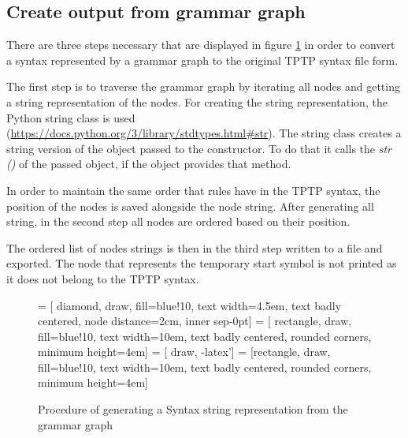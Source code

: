\subsection{Create output from grammar graph}\label{sec:ConceptOutputGrammarGraph}

There are three steps necessary that are displayed in figure \ref{fig:ConceptOutputGrammarGraphProcedure} in order to convert a syntax represented by a grammar graph to the original \ac{TPTP} syntax file form.

The first step is to traverse the grammar graph by iterating all nodes and getting a string representation of the nodes.
For creating the string representation, the Python string class is used (\url{https://docs.python.org/3/library/stdtypes.html#str}). The string class creates a string version of the object passed to the constructor.
To do that it calls the \textit{\textunderscore \textunderscore str \textunderscore \textunderscore ()} of the passed object, if the object provides that method.

In order to maintain the same order that rules have in the \ac{TPTP} syntax, the position of the nodes is saved alongside the node string. 
After generating all string, in the second step all nodes are ordered based on their position. 

The ordered list of nodes strings is then in the third step written to a file and exported.
The node that represents the temporary start symbol is not printed as it does not belong to the \ac{TPTP} syntax. 
 
\begin{figure}[H]
 = [ diamond, draw, fill=blue!10, text width=4.5em, text badly centered, node distance=2cm, inner sep-0pt]  
 = [ rectangle, draw, fill=blue!10, text width=10em, text badly centered, rounded corners, minimum height=4em]  
 = [ draw, -latex']  
 = [rectangle, draw, fill=blue!10, text width=10em, text badly centered, rounded corners, minimum height=4em]  
\begin{center}
\end{center}
\caption{Procedure of generating a Syntax string representation from the grammar graph}
\label{fig:ConceptOutputGrammarGraphProcedure}
\end{figure}

